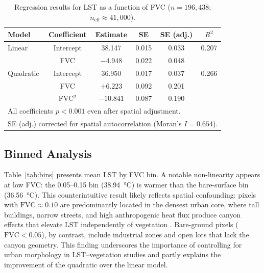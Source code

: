 \documentclass[preprint,12pt]{elsarticle}
\begin{document}
\begin{table}[htbp]
\centering
\caption{Regression results for LST as a function of FVC ($n = 196{,}438$; $n_{\text{eff}} \approx 41{,}000$).}
\label{tab:regression}
\begin{tabular}{lccccc}
\toprule
Model & Coefficient & Estimate & SE & SE (adj.) & $R^2$ \\
\midrule
Linear    & Intercept    & 38.147 & 0.015 & 0.033 & 0.207 \\
          & FVC          & $-4.948$ & 0.022 & 0.048 & \\
\addlinespace
Quadratic & Intercept    & 36.950 & 0.017 & 0.037 & 0.266 \\
          & FVC          & $+6.223$ & 0.092 & 0.201 & \\
          & FVC$^2$      & $-10.841$ & 0.087 & 0.190 & \\
\bottomrule
\multicolumn{6}{l}{\small All coefficients $p < 0.001$ even after spatial adjustment.} \\
\multicolumn{6}{l}{\small SE (adj.) corrected for spatial autocorrelation (Moran's $I = 0.654$).} \\
\end{tabular}
\end{table}

\subsection{Binned Analysis}

Table~\ref{tab:bins} presents mean LST by FVC bin. A notable non-linearity appears at low FVC: the 0.05--0.15 bin (\SI{38.94}{\degreeCelsius}) is warmer than the bare-surface bin (\SI{36.56}{\degreeCelsius}). This counterintuitive result likely reflects spatial confounding: pixels with $\text{FVC} \approx 0.10$ are predominantly located in the densest urban core, where tall buildings, narrow streets, and high anthropogenic heat flux produce canyon effects that elevate LST independently of vegetation \citep{oke1982}. Bare-ground pixels ($\text{FVC} < 0.05$), by contrast, include industrial zones and open lots that lack the canyon geometry. This finding underscores the importance of controlling for urban morphology in LST--vegetation studies and partly explains the improvement of the quadratic over the linear model.
\end{document}
